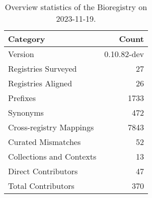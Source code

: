 \begin{table}
\caption{Overview statistics of the Bioregistry on 2023-11-19.}
\label{tab:bioregistry-summary}
\begin{tabular}{lr}
\toprule
Category & Count \\
\midrule
Version & 0.10.82-dev \\
Registries Surveyed & 27 \\
Registries Aligned & 26 \\
Prefixes & 1733 \\
Synonyms & 472 \\
Cross-registry Mappings & 7843 \\
Curated Mismatches & 52 \\
Collections and Contexts & 13 \\
Direct Contributors & 47 \\
Total Contributors & 370 \\
\bottomrule
\end{tabular}
\end{table}
